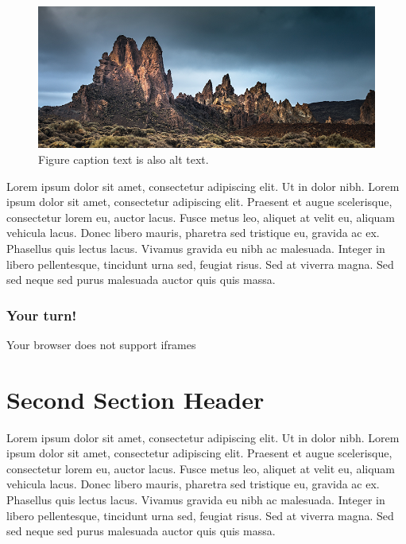 \documentclass[
]{book}
\begin{document}
\begin{figure}
\centering
\includegraphics{images/01-image.png}
\caption{Figure caption text is also alt text.}
\end{figure}

Lorem ipsum dolor sit amet, consectetur adipiscing elit. Ut in dolor nibh. Lorem ipsum dolor sit amet, consectetur adipiscing elit. Praesent et augue scelerisque, consectetur lorem eu, auctor lacus. Fusce metus leo, aliquet at velit eu, aliquam vehicula lacus. Donec libero mauris, pharetra sed tristique eu, gravida ac ex. Phasellus quis lectus lacus. Vivamus gravida eu nibh ac malesuada. Integer in libero pellentesque, tincidunt urna sed, feugiat risus. Sed at viverra magna. Sed sed neque sed purus malesuada auctor quis quis massa.

\hypertarget{your-turn}{%
\subsubsection*{Your turn!}\label{your-turn}}

Your browser does not support iframes

\hypertarget{second-section-header}{%
\section{Second Section Header}\label{second-section-header}}

Lorem ipsum dolor sit amet, consectetur adipiscing elit. Ut in dolor nibh. Lorem ipsum dolor sit amet, consectetur adipiscing elit. Praesent et augue scelerisque, consectetur lorem eu, auctor lacus. Fusce metus leo, aliquet at velit eu, aliquam vehicula lacus. Donec libero mauris, pharetra sed tristique eu, gravida ac ex. Phasellus quis lectus lacus. Vivamus gravida eu nibh ac malesuada. Integer in libero pellentesque, tincidunt urna sed, feugiat risus. Sed at viverra magna. Sed sed neque sed purus malesuada auctor quis quis massa.
\end{document}
